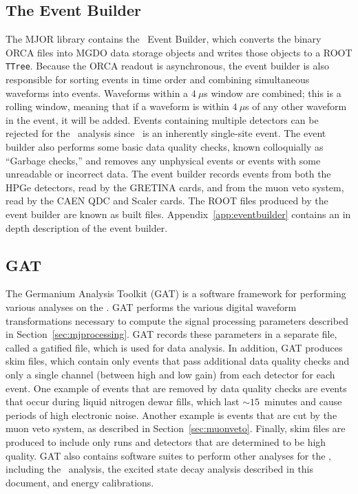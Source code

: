 \documentclass[/main.tex]{subfiles}
\begin{document}
\subsection{The Event Builder}\label{sec:eventbuilder}
The MJOR library contains the \MJ\ Event Builder, which converts the binary ORCA files into MGDO data storage objects and writes those objects to a ROOT \texttt{TTree}.
Because the ORCA readout is asynchronous, the event builder is also responsible for sorting events in time order and combining simultaneous waveforms into events.
Waveforms within a $4~\mu$s window are combined; this is a rolling window, meaning that if a waveform is within $4~\mu$s of any other waveform in the event, it will be added.
Events containing multiple detectors can be rejected for the \znbb\ analysis since \znbb\ is an inherently single-site event.
The event builder also performs some basic data quality checks, known colloquially as ``Garbage checks,'' and removes any unphysical events or events with some unreadable or incorrect data.
The event builder records events from both the HPGe detectors, read by the GRETINA cards, and from the muon veto system, read by the CAEN QDC and Scaler cards.
The ROOT files produced by the event builder are known as built files.
Appendix~\ref{app:eventbuilder} contains an in depth description of the event builder.

\subsection{GAT}
The Germanium Analysis Toolkit (GAT) is a software framework for performing various analyses on the \MJD.
GAT performs the various digital waveform transformations necessary to compute the signal processing parameters described in Section~\ref{sec:mjprocessing}.
GAT records these parameters in a separate file, called a gatified file, which is used for data analysis.
In addition, GAT produces skim files, which contain only events that pass additional data quality checks and only a single channel (between high and low gain) from each detector for each event.
One example of events that are removed by data quality checks are events that occur during liquid nitrogen dewar fills, which last ${\sim}15$~minutes and cause periods of high electronic noise.
Another example is events that are cut by the muon veto system, as described in Section~\ref{sec:muonveto}.
Finally, skim files are produced to include only runs and detectors that are determined to be high quality.
GAT also contains software suites to perform other analyses for the \MJD, including the \znbb\ analysis, the excited state decay analysis described in this document, and energy calibrations.
\end{document}
